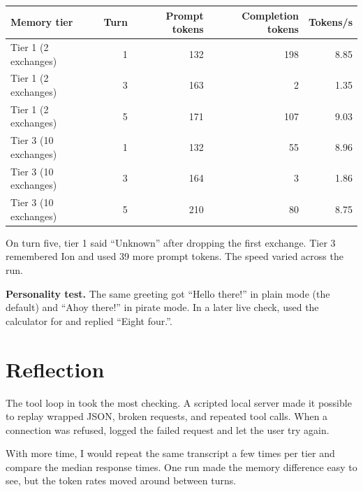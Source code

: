 \begin{center}
\begin{tabular}{@{}lrrrr@{}}
\toprule
\textbf{Memory tier} & \textbf{Turn} & \textbf{Prompt tokens} & \textbf{Completion tokens} & \textbf{Tokens/s}\\
\midrule
Tier 1 (2 exchanges)  & 1 & 132 & 198 & 8.85\\
Tier 1 (2 exchanges)  & 3 & 163 &   2 & 1.35\\
Tier 1 (2 exchanges)  & 5 & 171 & 107 & 9.03\\
\addlinespace
Tier 3 (10 exchanges) & 1 & 132 &  55 & 8.96\\
Tier 3 (10 exchanges) & 3 & 164 &   3 & 1.86\\
Tier 3 (10 exchanges) & 5 & 210 &  80 & 8.75\\
\bottomrule
\end{tabular}
\end{center}

On turn five, tier 1 said \textquotedblleft{}Unknown\textquotedblright{} after dropping the first exchange. Tier 3 remembered Ion and used 39 more prompt tokens. The speed varied across the run.

\textbf{Personality test.} The same greeting got \textquotedblleft{}Hello there!\textquotedblright{} in plain mode (the default) and \textquotedblleft{}Ahoy there!\textquotedblright{} in pirate mode. In a later live check,  used the calculator for  and replied \textquotedblleft{}Eight four.\textquotedblright{}.

\section{Reflection}
The tool loop in  took the most checking. A scripted local server made it possible to replay wrapped JSON, broken requests, and repeated tool calls. When a connection was refused,  logged the failed request and let the user try again.

With more time, I would repeat the same transcript a few times per tier and compare the median response times. One run made the memory difference easy to see, but the token rates moved around between turns.
